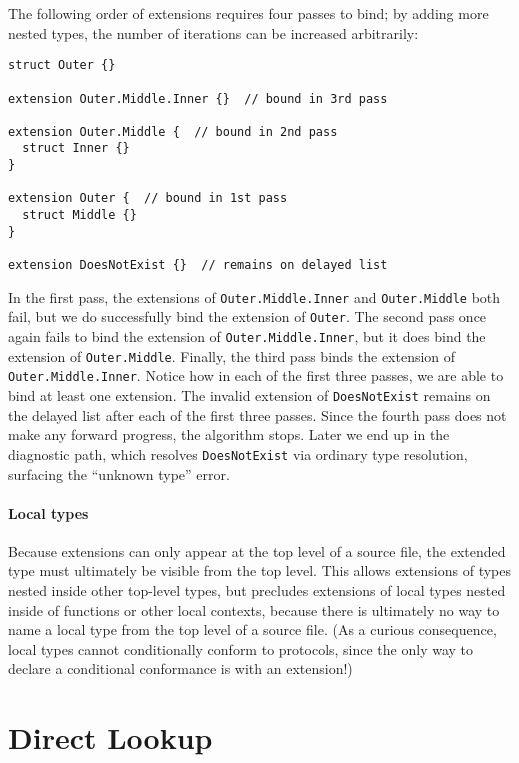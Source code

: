 \documentclass[../generics]{subfiles}
\begin{document}
\begin{example}
The following order of extensions requires four passes to bind; by adding more nested types, the number of iterations can be increased arbitrarily:
\begin{Verbatim}
struct Outer {}

extension Outer.Middle.Inner {}  // bound in 3rd pass

extension Outer.Middle {  // bound in 2nd pass
  struct Inner {}
}

extension Outer {  // bound in 1st pass
  struct Middle {}
}

extension DoesNotExist {}  // remains on delayed list
\end{Verbatim}

In the first pass, the extensions of \texttt{Outer.Middle.Inner} and \texttt{Outer.Middle} both fail, but we do successfully bind the extension of \texttt{Outer}. The second pass once again fails to bind the extension of \texttt{Outer.Middle.Inner}, but it does bind the extension of \texttt{Outer.Middle}. Finally, the third pass binds the extension of \texttt{Outer.Middle.Inner}. Notice how in each of the first three passes, we are able to bind at least one extension. The invalid extension of \texttt{DoesNotExist} remains on the delayed list after each of the first three passes. Since the fourth pass does not make any forward progress, the algorithm stops. Later we end up in the diagnostic path, which resolves \texttt{DoesNotExist} via ordinary type resolution, surfacing the ``unknown type'' error.
\end{example}

\paragraph{Local types}
Because extensions can only appear at the top level of a source file, the extended type must ultimately be visible from the top level. This allows extensions of types nested inside other top-level types, but precludes extensions of local types nested inside of functions or other local contexts, because there is ultimately no way to name a local type from the top level of a source file. (As a curious consequence, local types cannot conditionally conform to protocols, since the only way to declare a conditional conformance is with an extension!)

\section{Direct Lookup}
\end{document}
